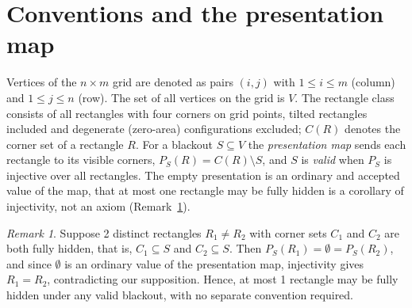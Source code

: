 \documentclass[12pt]{article}
\theoremstyle{definition}\newtheorem{definition}{Definition}
\theoremstyle{remark}\newtheorem{remark}{Remark}
\newcommand{\pres}{P_S}
\begin{document}
\section{Conventions and the presentation map}\label{sec:conventions}
Vertices of the $n\times m$ grid are denoted as pairs $(i,j)$ with $1\le i\le m$ (column) and
$1\le j\le n$ (row). The set of all vertices on the grid is $V$. The rectangle class consists of all rectangles with four corners on
grid points, tilted rectangles included and degenerate (zero-area) configurations
excluded; $C(R)$ denotes the corner set of a rectangle $R$. For a blackout $S\subseteq V$
the \emph{presentation map} sends each rectangle to its visible corners,
$\pres(R)=C(R)\setminus S$, and $S$ is \emph{valid} when $\pres$ is injective over all
rectangles. The empty presentation is an ordinary and accepted value of the map, that at most one
rectangle may be fully hidden is a corollary of injectivity, not an axiom
(Remark~\ref{rem:empty}).

\begin{remark}\label{rem:empty}
Suppose 2 distinct rectangles $R_1 \neq R_2$ with corner sets $C_1$ and $C_2$ are both fully hidden, that is, $C_1 \subseteq S$ and $C_2 \subseteq S$. Then $\pres(R_1) = \emptyset = \pres(R_2)$, and since $\emptyset$ is an ordinary value of the presentation map, injectivity gives $R_1 = R_2$, contradicting our supposition. Hence, at most 1 rectangle may be fully hidden under any valid blackout, with no separate convention required.
\end{remark}
\end{document}
